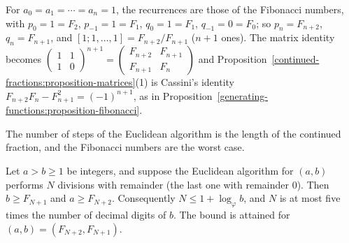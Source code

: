 \begin{example}\label{continued-fractions:example-fibonacci}
For $a_0 = a_1 = \cdots = a_n = 1$, the recurrences are those of the Fibonacci numbers, with $p_0 = 1 = F_2$, $p_{-1} = 1 = F_1$, $q_0 = 1 = F_1$, $q_{-1} = 0 = F_0$; so $p_n = F_{n+2}$,
$q_n = F_{n+1}$, and $[1; 1, \ldots, 1] = F_{n+2}/F_{n+1}$ ($n + 1$ ones). The matrix identity becomes $\begin{pmatrix}1 & 1\\ 1 & 0\end{pmatrix}^{n+1} = \begin{pmatrix}F_{n+2} & F_{n+1}\\ F_{n+1} & F_n\end{pmatrix}$
and Proposition~\ref{continued-fractions:proposition-matrices}(1) is Cassini's identity $F_{n+2}F_n - F_{n+1}^2 = (-1)^{n+1}$, as in Proposition~\ref{generating-functions:proposition-fibonacci}.
\end{example}

The number of steps of the Euclidean algorithm is the length of the continued fraction, and the Fibonacci numbers are the worst case.

\begin{theorem}[Lamé]\label{continued-fractions:theorem-lame}
Let $a > b \geq 1$ be integers, and suppose the Euclidean algorithm for $(a, b)$ performs $N$ divisions with remainder (the last one with remainder $0$). Then $b \geq F_{N+1}$ and $a \geq F_{N+2}$.
Consequently $N \leq 1 + \log_\varphi b$, and $N$ is at most five times the number of decimal digits of $b$. The bound is attained for $(a, b) = (F_{N+2}, F_{N+1})$.
\end{theorem}

